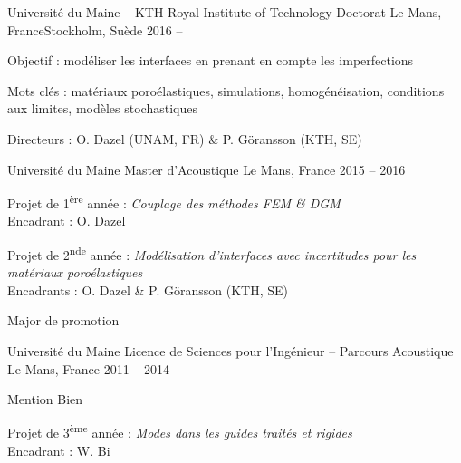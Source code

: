 

\begin{cventries}

  \cventry
    {Université du Maine -- KTH Royal Institute of Technology} %
		{Doctorat} %
    {Le Mans, France\newline Stockholm, Suède} %
    {2016 -- } %
    {
      \begin{cvitems} %
					\item Objectif : modéliser les interfaces en prenant en compte les imperfections
					\item Mots clés : matériaux poroélastiques, simulations, homogénéisation,
						conditions aux limites, modèles stochastiques
					\item Directeurs : O. Dazel (UNAM, FR) \& P. Göransson (KTH, SE)
      \end{cvitems}
    }

  \cventry
    {Université du Maine} %
		{Master d'Acoustique} %
    {Le Mans, France} %
    {2015 -- 2016} %
    {
      \begin{cvitems} %
				\item {Projet de 1\textsuperscript{ère} année : \textit{Couplage des méthodes FEM \& DGM}\\
					Encadrant : O. Dazel}
				\item {Projet de 2\textsuperscript{nde} année : \textit{Modélisation d'interfaces avec incertitudes pour les matériaux poroélastiques}
					\\Encadrants : O. Dazel \& P. Göransson (KTH, SE)}
				\item Major de promotion
      \end{cvitems}
    }

  \cventry
    {Université du Maine} %
		{Licence de Sciences pour l'Ingénieur -- Parcours Acoustique} %
    {Le Mans, France} %
    {2011 -- 2014} %
    {
      \begin{cvitems} %
        \item {Mention Bien}
				\item {Projet de 3\textsuperscript{ème} année : \textit{Modes dans les guides traités et rigides}
					\\Encadrant : W. Bi}
      \end{cvitems}
    }


\end{cventries}
